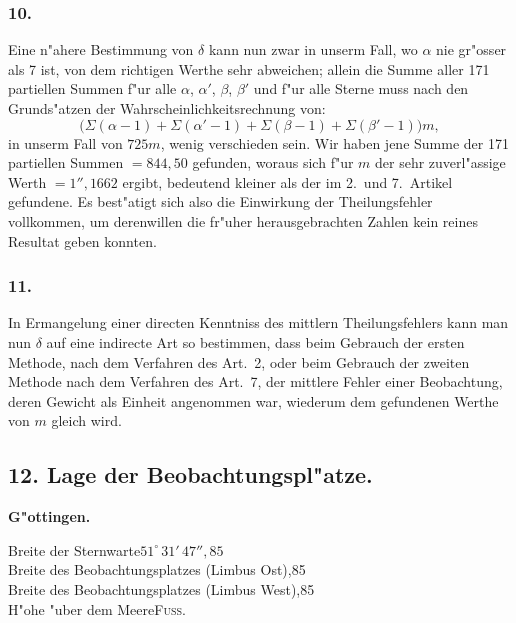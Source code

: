 \documentclass[12pt,a4paper]{article}
\theoremstyle{plain}
\theoremstyle{definition}
\theoremstyle{remark}
\begin{document}
\subsubsection*{10.}

Eine n"ahere Bestimmung von $\delta$ kann nun zwar in unserm Fall, wo $\alpha$
nie gr"osser als 7 ist, von dem richtigen Werthe sehr abweichen; allein die
Summe aller 171 partiellen Summen f"ur alle $\alpha$, $\alpha'$, $\beta$, $\beta'$ und f"ur alle
Sterne muss nach den Grunds"atzen der Wahrscheinlichkeitsrechnung von:
\[
\bigl(\Sigma(\alpha - 1) + \Sigma(\alpha' - 1) + \Sigma(\beta - 1) + \Sigma(\beta' - 1)\bigr)m,
\]
in unserm Fall von $725m$, wenig verschieden sein. Wir haben jene Summe
der 171 partiellen Summen $= 844{,}50$ gefunden, woraus sich f"ur $m$ der
sehr zuverl"assige Werth $= 1''{,}1662$ ergibt, bedeutend kleiner als der im
2.~und 7.~Artikel gefundene. Es best"atigt sich also die Einwirkung der
Theilungsfehler vollkommen, um derenwillen die fr"uher herausgebrachten
Zahlen kein reines Resultat geben konnten.

\subsubsection*{11.}

In Ermangelung einer directen Kenntniss des mittlern Theilungsfehlers
kann man nun $\delta$ auf eine indirecte Art so bestimmen, dass beim Gebrauch
der ersten Methode, nach dem Verfahren des Art.~2, oder beim Gebrauch
der zweiten Methode nach dem Verfahren des Art.~7, der mittlere Fehler
einer Beobachtung, deren Gewicht als Einheit angenommen war, wiederum
dem gefundenen Werthe von $m$ gleich wird.

\subsection*{12. Lage der Beobachtungspl"atze.}

\vspace{0.3cm}
\noindent
\textbf{G"ottingen.}

\medskip
\noindent
Breite der Sternwarte\dotfill $51^\circ\,31'\,47''{,}85$ \\
Breite des Beobachtungsplatzes (Limbus Ost),85 \\
Breite des Beobachtungsplatzes (Limbus West),85 \\
H"ohe "uber dem Meere\quad\textsc{Fuss.}
\end{document}
